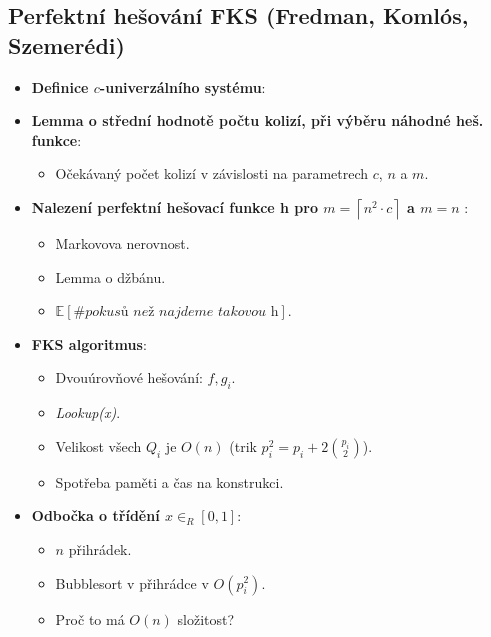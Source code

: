 \documentclass[11pt,a4paper]{article}
\begin{document}
\subsection{Perfektní hešování FKS (Fredman, Komlós, Szemerédi)}
\begin{itemize}
    \item \textbf{Definice $c$-univerzálního systému}:
    \item \textbf{Lemma o střední hodnotě počtu kolizí, při výběru náhodné heš. funkce}:
    \begin{itemize}
        \item Očekávaný počet kolizí v závislosti na parametrech $c$, $n$ a $m$.
    \end{itemize}
    \item \textbf{Nalezení perfektní hešovací funkce h pro $ m = \left\lceil n^2 \cdot c \right\rceil$ a $ m = n $ }:
    \begin{itemize}
        \item Markovova nerovnost.
        \item Lemma o džbánu.
        \item $\mathbb{E}[\# \textit{pokusů než najdeme takovou h}]$.
    \end{itemize}
    \item \textbf{FKS algoritmus}:
    \begin{itemize}
        \item Dvouúrovňové hešování: $ f, g_i $.
        \item \textit{Lookup(x)}.
        \item Velikost všech $Q_i$ je $ O(n) $ (trik $ p_i^2 = p_i + 2\binom{p_i}{2} $).
        \item Spotřeba paměti a čas na konstrukci.
    \end{itemize}
    \item \textbf{Odbočka o třídění $ x \in_R [0,1] $}:
    \begin{itemize}
        \item $ n $ přihrádek.
        \item Bubblesort v přihrádce v $ O(p_i^2) $.
        \item Proč to má $ O(n) $ složitost?
    \end{itemize}
\end{itemize}
\end{document}
